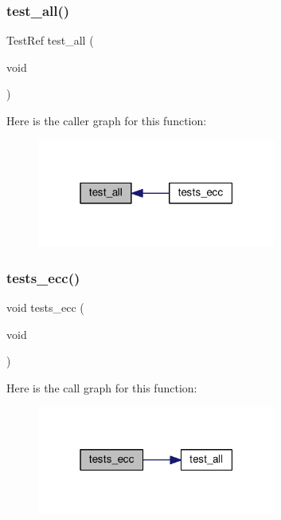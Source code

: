 \subsubsection{\texorpdfstring{test\+\_\+all()}{test\_all()}}
{\footnotesize\ttfamily Test\+Ref test\+\_\+all (\begin{DoxyParamCaption}\item[{void}]{ }\end{DoxyParamCaption})}

Here is the caller graph for this function\+:
\nopagebreak
\begin{figure}[H]
\begin{center}
\leavevmode
\includegraphics[width=223pt]{tests-ecc_8c_aae4be52b6ff9212dfcbb25f4b637020d_icgraph}
\end{center}
\end{figure}
\mbox{\label{tests-ecc_8c_a6d49a5eef05a40d3deb7c268624eb589}} 
\subsubsection{\texorpdfstring{tests\+\_\+ecc()}{tests\_ecc()}}
{\footnotesize\ttfamily void tests\+\_\+ecc (\begin{DoxyParamCaption}\item[{void}]{ }\end{DoxyParamCaption})}

Here is the call graph for this function\+:
\nopagebreak
\begin{figure}[H]
\begin{center}
\leavevmode
\includegraphics[width=223pt]{tests-ecc_8c_a6d49a5eef05a40d3deb7c268624eb589_cgraph}
\end{center}
\end{figure}
